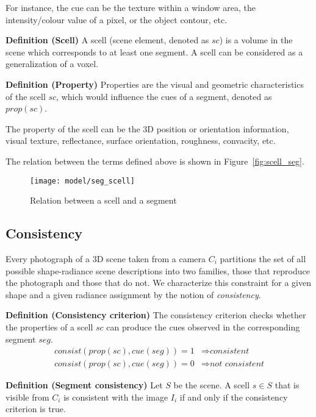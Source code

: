 For instance, the cue can be the texture within a window area, the intensity/colour value of a pixel, or the object contour, etc.

\noindent\textbf{Definition (Scell)} A scell (scene element, denoted as $sc$) is a volume in the scene which corresponds to at least one segment. A scell can be considered as a generalization of a voxel.

\noindent\textbf{Definition (Property)} Properties are the visual and geometric characteristics of the scell $sc$, which would influence the cues of a segment, denoted as $prop(sc)$.

The property of the scell can be the 3D position or orientation information, visual texture, reflectance, surface orientation, roughness, convacity, etc.

The relation between the terms defined above is shown in Figure~\ref{fig:scell_seg}.
\begin{figure}[!htbp]
\centering
\texttt{[image: model/seg\_scell]}
\caption{Relation between a scell and a segment}
\label{fig::scell_seg}
\end{figure}


\subsection{Consistency}
Every photograph of a 3D scene taken from a camera $C_i$ partitions the set of all possible shape-radiance scene descriptions into two families, those that reproduce the photograph and those that do not. We characterize this constraint for a given shape and a given radiance assignment by the notion of \textit{consistency}.

\noindent\textbf{Definition (Consistency criterion)} The consistency criterion checks whether the properties of a scell $sc$ can produce the cues observed in the corresponding segment $seg$.
\begin{align*}
consist(prop(sc), cue(seg)) = 1 &\Rightarrow \textit{consistent}\\
consist(prop(sc), cue(seg)) = 0 &\Rightarrow \textit{not consistent}
\end{align*}

\noindent\textbf{Definition (Segment consistency)} Let $S$ be the scene. A scell $s\in S$ that is visible from $C_i$ is consistent with the image $I_i$ if and only if the consistency criterion is true.

